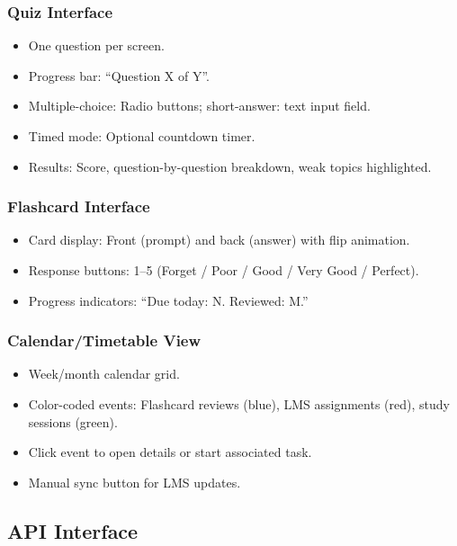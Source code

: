 \documentclass[12pt,a4paper]{article}
\begin{document}
\subsubsection{Quiz Interface}

\begin{itemize}
    \item One question per screen.
    \item Progress bar: ``Question X of Y''.
    \item Multiple-choice: Radio buttons; short-answer: text input field.
    \item Timed mode: Optional countdown timer.
    \item Results: Score, question-by-question breakdown, weak topics highlighted.
\end{itemize}

\subsubsection{Flashcard Interface}

\begin{itemize}
    \item Card display: Front (prompt) and back (answer) with flip animation.
    \item Response buttons: 1--5 (Forget / Poor / Good / Very Good / Perfect).
    \item Progress indicators: ``Due today: N. Reviewed: M.''
\end{itemize}

\subsubsection{Calendar/Timetable View}

\begin{itemize}
    \item Week/month calendar grid.
    \item Color-coded events: Flashcard reviews (blue), LMS assignments (red), study sessions (green).
    \item Click event to open details or start associated task.
    \item Manual sync button for LMS updates.
\end{itemize}

\subsection{API Interface}
\end{document}
